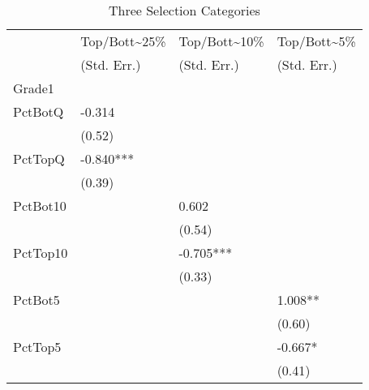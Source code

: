\begin{table}[htb]
  \centering
  \begin{threeparttable}
    \caption{Three Selection Categories}\label{tab:3sc}
    \begin{tabular}{l l l l} 
      \hline
      \hline
               & Top/Bott{\textasciitilde}25\% & Top/Bott{\textasciitilde}10\% & Top/Bott{\textasciitilde}5\% \\
               & (Std. Err.)                   & (Std. Err.)                   & (Std. Err.)                  \\
      \hline
      Grade1   &                               &                               &                              \\
      PctBotQ  & -0.314                        &                               &                              \\
               & (0.52)                        &                               &                              \\
      PctTopQ  & -0.840***                     &                               &                              \\
               & (0.39)                        &                               &                              \\
      PctBot10 &                               & 0.602                         &                              \\
               &                               & (0.54)                        &                              \\
      PctTop10 &                               & -0.705***                     &                              \\
               &                               & (0.33)                        &                              \\
      PctBot5  &                               &                               & 1.008**                      \\
               &                               &                               & (0.60)                       \\
      PctTop5  &                               &                               & -0.667*                      \\
               &                               &                               & (0.41)                       \\
      \hline

\end{tabular}
\end{threeparttable}
\end{table}

